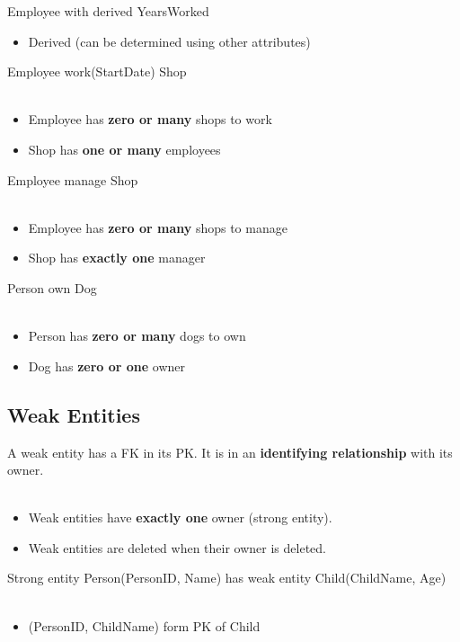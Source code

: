 \documentclass[12pt, a4paper]{article}
\begin{document}
    Employee with derived YearsWorked 
    \begin{itemize}
        \item Derived (can be determined using other attributes) 
    \end{itemize}

    Employee work(StartDate) Shop \\\\ 
    \begin{itemize}
        \item Employee has \textbf{zero or many} shops to work 
        \item Shop has \textbf{one or many} employees 
    \end{itemize}

    Employee manage Shop \\\\ 
    \begin{itemize}
        \item Employee has \textbf{zero or many} shops to manage 
        \item Shop has \textbf{exactly one} manager 
    \end{itemize}

    Person own Dog \\\\ 
    \begin{itemize}
        \item Person has \textbf{zero or many} dogs to own 
        \item Dog has \textbf{zero or one} owner 
    \end{itemize}

    \subsection{Weak Entities}
    A weak entity has a FK in its PK. It is in an \textbf{identifying 
    relationship} with its owner. \\\\ 
    \begin{itemize}
        \item Weak entities have \textbf{exactly one} owner (strong entity). 
        \item Weak entities are deleted when their owner is deleted. 
    \end{itemize}
    Strong entity Person(PersonID, Name) has weak entity Child(ChildName, Age) \\\\ 
    \begin{itemize}
        \item (PersonID, ChildName) form PK of Child 
    \end{itemize}
\end{document}
